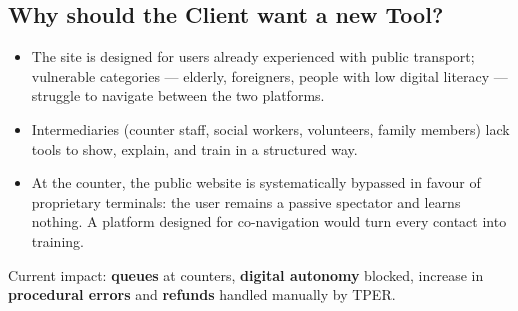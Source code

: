 ﻿\documentclass[11pt,a4paper]{article}
\begin{document}
\subsection{Why should the Client want a new Tool?}
\begin{itemize}[leftmargin=*]
    \item The site is designed for users already experienced with public
    transport; vulnerable categories --- elderly, foreigners, people with low
    digital literacy --- struggle to navigate between the two platforms.
    \item Intermediaries (counter staff, social workers, volunteers,
    family members) lack tools to show, explain, and train in a
    structured way.
    \item At the counter, the public website is systematically bypassed
    in favour of proprietary terminals: the user remains a passive spectator
    and learns nothing. A platform designed for co-navigation would turn
    every contact into training.
\end{itemize}
Current impact: \textbf{queues} at counters, \textbf{digital autonomy}
blocked, increase in \textbf{procedural errors} and \textbf{refunds} handled
manually by TPER.
\end{document}
